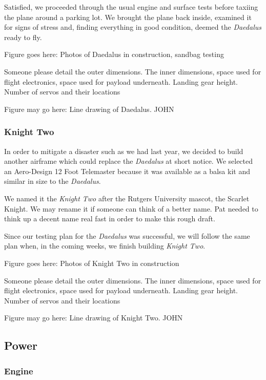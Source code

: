\documentclass[10pt]{report}
\begin{document}
Satisfied, we proceeded through the usual engine and surface tests before taxiing the plane around a parking lot.  We brought the plane back inside, examined it for signs of stress and, finding everything in good condition, deemed the \emph{Daedalus} ready to fly.


Figure goes here: Photos of Daedalus in construction, sandbag testing

Someone please detail the outer dimensions. The inner dimensions, space used for flight electronics, space used for payload underneath. Landing gear height. Number of servos and their locations

Figure may go here: Line drawing of Daedalus. JOHN

\subsubsection{Knight Two}

In order to mitigate a disaster such as we had last year, we decided to build another airframe which could replace the \emph{Daedalus} at short notice. We selected an Aero-Design 12 Foot Telemaster \cite{aerodesign} because it was available as a balsa kit and similar in size to the \emph{Daedalus}.

We named it the \emph{Knight Two} after the Rutgers University mascot, the Scarlet Knight. We may rename it if someone can think of a better name. Pat needed to think up a decent name real fast in order to make this rough draft.

Since our testing plan for the \emph{Daedalus} was successful, we will follow the same plan when, in the coming weeks, we finish building \emph{Knight Two}.

Figure goes here: Photos of Knight Two in construction

Someone please detail the outer dimensions. The inner dimensions, space used for flight electronics, space used for payload underneath. Landing gear height. Number of servos and their locations

Figure may go here: Line drawing of Knight Two. JOHN

\subsection{Power}

\subsubsection{Engine}
\end{document}
